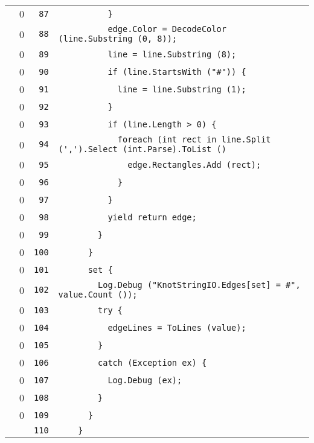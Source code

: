 \documentclass[a4paper,10pt]{article}
\begin{document}
\begin{longtable}[l]{lrrl}
\cellcolor{red} & 0 & \verb~87~ & \verb~          }~\\
\cellcolor{red} & 0 & \verb~88~ & \verb~          edge.Color = DecodeColor (line.Substring (0, 8));~\\
\cellcolor{red} & 0 & \verb~89~ & \verb~          line = line.Substring (8);~\\
\cellcolor{red} & 0 & \verb~90~ & \verb~          if (line.StartsWith ("#")) {~\\
\cellcolor{red} & 0 & \verb~91~ & \verb~            line = line.Substring (1);~\\
\cellcolor{red} & 0 & \verb~92~ & \verb~          }~\\
\cellcolor{red} & 0 & \verb~93~ & \verb~          if (line.Length > 0) {~\\
\cellcolor{red} & 0 & \verb~94~ & \verb~            foreach (int rect in line.Split (',').Select (int.Parse).ToList ()~\\
\cellcolor{red} & 0 & \verb~95~ & \verb~              edge.Rectangles.Add (rect);~\\
\cellcolor{red} & 0 & \verb~96~ & \verb~            }~\\
\cellcolor{red} & 0 & \verb~97~ & \verb~          }~\\
\cellcolor{red} & 0 & \verb~98~ & \verb~          yield return edge;~\\
\cellcolor{red} & 0 & \verb~99~ & \verb~        }~\\
\cellcolor{red} & 0 & \verb~100~ & \verb~      }~\\
\cellcolor{red} & 0 & \verb~101~ & \verb~      set {~\\
\cellcolor{red} & 0 & \verb~102~ & \verb~        Log.Debug ("KnotStringIO.Edges[set] = #", value.Count ());~\\
\cellcolor{red} & 0 & \verb~103~ & \verb~        try {~\\
\cellcolor{red} & 0 & \verb~104~ & \verb~          edgeLines = ToLines (value);~\\
\cellcolor{red} & 0 & \verb~105~ & \verb~        }~\\
\cellcolor{red} & 0 & \verb~106~ & \verb~        catch (Exception ex) {~\\
\cellcolor{red} & 0 & \verb~107~ & \verb~          Log.Debug (ex);~\\
\cellcolor{red} & 0 & \verb~108~ & \verb~        }~\\
\cellcolor{red} & 0 & \verb~109~ & \verb~      }~\\
\cellcolor{gray} &  & \verb~110~ & \verb~    }~\\

\end{longtable}
\end{document}
